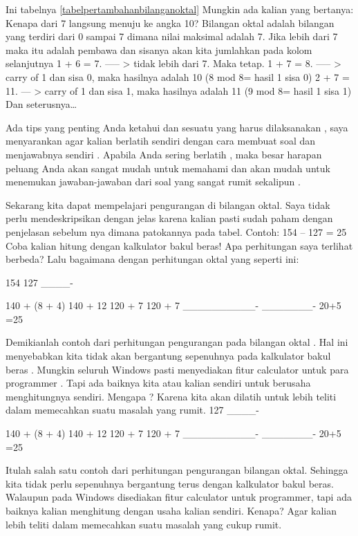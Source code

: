 Ini tabelnya \ref{tabelpertambahanbilanganoktal}
Mungkin ada kalian yang bertanya: Kenapa dari 7 langsung menuju ke angka 10?
Bilangan oktal adalah bilangan yang terdiri dari 0 sampai 7 dimana nilai maksimal adalah 7. Jika lebih dari 7 maka itu  adalah pembawa dan sisanya akan kita jumlahkan pada kolom selanjutnya
1 + 6 = 7. —– > tidak lebih dari 7. Maka tetap.
1 + 7 = 8. —– > carry of 1 dan sisa 0, maka hasilnya adalah 10 (8 mod 8= hasil 1 sisa 0)
2 + 7 = 11. — > carry of 1 dan sisa 1, maka hasilnya adalah 11 (9 mod 8= hasil 1 sisa 1)
Dan seterusnya…

Ada tips yang penting Anda ketahui dan sesuatu yang harus dilaksanakan , saya menyarankan agar kalian berlatih sendiri dengan cara membuat soal dan menjawabnya sendiri . Apabila Anda sering berlatih , maka besar harapan peluang Anda akan sangat mudah untuk memahami dan akan mudah untuk menemukan jawaban-jawaban dari soal yang sangat rumit sekalipun .

Sekarang kita dapat mempelajari pengurangan di bilangan oktal. Saya tidak perlu mendeskripsikan dengan jelas karena kalian pasti sudah paham dengan penjelasan sebelum nya dimana patokannya pada tabel.
Contoh:
154 – 127 = 25
Coba kalian hitung dengan kalkulator bakul beras! Apa perhitungan saya terlihat berbeda?
Lalu bagaimana dengan perhitungan oktal yang seperti ini:

154
127
____-
 
140 + (8 + 4)                        140 + 12
120 +        7                           120 +   7
__________-                    _______-
                                                20+5
                                                =25

Demikianlah contoh dari perhitungan pengurangan pada bilangan oktal . Hal ini menyebabkan kita tidak akan bergantung sepenuhnya pada kalkulator bakul beras . Mungkin seluruh Windows pasti menyediakan fitur calculator untuk para programmer . Tapi ada baiknya kita atau kalian sendiri untuk berusaha menghitungnya sendiri. Mengapa ? Karena kita akan dilatih untuk lebih teliti dalam memecahkan suatu masalah yang rumit. 
127
____-
 
140 + (8 + 4)                        140 + 12
120 +    7                           120 +   7
__________-                    _______-
                                                20+5
                                                =25

Itulah salah satu contoh dari perhitungan pengurangan bilangan oktal. Sehingga kita tidak perlu sepenuhnya bergantung terus dengan kalkulator bakul beras. Walaupun pada Windows disediakan fitur calculator untuk programmer, tapi ada baiknya kalian menghitung dengan usaha kalian sendiri. Kenapa? Agar kalian lebih teliti dalam memecahkan suatu masalah yang cukup rumit.
 
